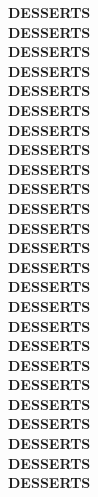 \documentclass[8pt]{report}
\begin{document}
\begin{flushright}

\bf{DESSERTS}\\  
\bf{DESSERTS}\\
\bf{DESSERTS}\\
\bf{DESSERTS}\\
\bf{DESSERTS}\\
\bf{DESSERTS}\\
\bf{DESSERTS}\\
\bf{DESSERTS}\\
\bf{DESSERTS}\\
\bf{DESSERTS}\\
\bf{DESSERTS}\\
\bf{DESSERTS}\\
\bf{DESSERTS}\\
\bf{DESSERTS}\\
\bf{DESSERTS}\\
\bf{DESSERTS}\\
\bf{DESSERTS}\\
\bf{DESSERTS}\\
\bf{DESSERTS}\\
\bf{DESSERTS}\\
\bf{DESSERTS}\\
\bf{DESSERTS}\\
\bf{DESSERTS}\\
\bf{DESSERTS}\\
\bf{DESSERTS}\\


\end{flushright}

\newpage
\normalsize
\centering
\end{document}
